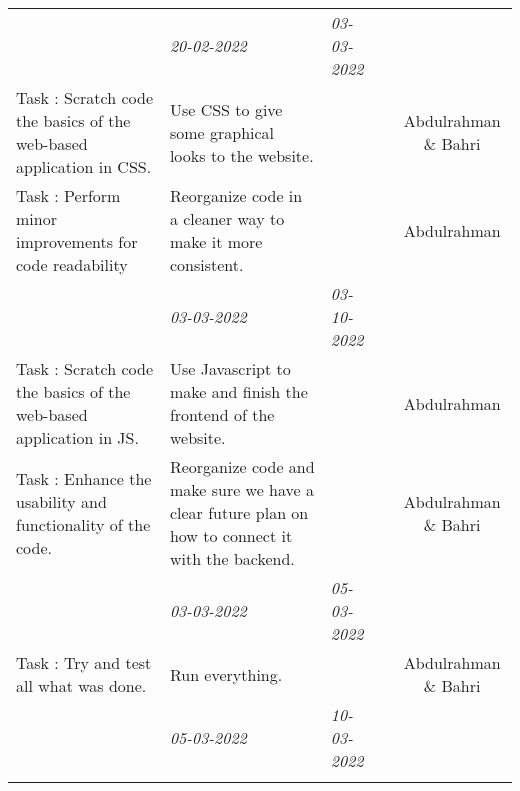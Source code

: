 \begin{center}
\begin{small}
\begin{xltabular}{\textwidth}{ p{3cm} p{5cm} X X c }
			\addlinespace
			& \emph{20-02-2022} & \emph{03-03-2022} & 
			\\ \addlinespace

			
			Task \thesubcounter: 
			Scratch code the basics of the web-based application in CSS.
			& Use CSS to give some graphical looks to the website.
			& & & Abdulrahman \& Bahri\\
			
			Task \thesubcounter: 
			Perform minor improvements for code readability
			& Reorganize code in a cleaner way to make it more consistent.
			& & & Abdulrahman \\
			
			\addlinespace
			
					\addlinespace
			& \emph{03-03-2022} & \emph{03-10-2022} & 
			\\ \addlinespace
			
			Task \thesubcounter: 
			Scratch code the basics of the web-based application in JS.
			& Use Javascript to make and finish the frontend of the website.
			& & & Abdulrahman \\
			
			Task \thesubcounter: 
			Enhance the usability and functionality of the code.
			& Reorganize code and make sure we have a clear future plan on how to connect it with the backend.
			& & & Abdulrahman \& Bahri\\
			
			\addlinespace
			
			
			
					\addlinespace
			& \emph{03-03-2022} & \emph{05-03-2022} & 
			\\ \addlinespace
			
			Task \thesubcounter: 
			Try and test all what was done.
			& Run everything.
			& & & Abdulrahman \& Bahri \\

			\addlinespace
			
					\addlinespace
			& \emph{05-03-2022} & \emph{10-03-2022} & 
			\\ \addlinespace
			

\end{xltabular}
\end{small}
\end{center}
